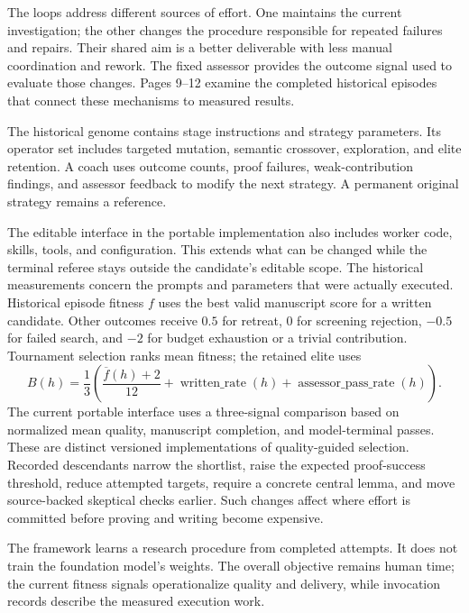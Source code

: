 The loops address different sources of effort. One maintains the current investigation; the other changes the procedure responsible for repeated failures and repairs. Their shared aim is a better deliverable with less manual coordination and rework. The fixed assessor provides the outcome signal used to evaluate those changes. Pages 9--12 examine the completed historical episodes that connect these mechanisms to measured results.

The historical genome contains stage instructions and strategy parameters. Its operator set includes targeted mutation, semantic crossover, exploration, and elite retention. A coach uses outcome counts, proof failures, weak-contribution findings, and assessor feedback to modify the next strategy. A permanent original strategy remains a reference.

The editable interface in the portable implementation also includes worker code, skills, tools, and configuration. This extends what can be changed while the terminal referee stays outside the candidate's editable scope. The historical measurements concern the prompts and parameters that were actually executed.
Historical episode fitness $f$ uses the best valid manuscript score for a written candidate. Other outcomes receive $0.5$ for retreat, $0$ for screening rejection, $-0.5$ for failed search, and $-2$ for budget exhaustion or a trivial contribution. Tournament selection ranks mean fitness; the retained elite uses
\[
B(h)=\frac13\left(\frac{\overline f(h)+2}{12}
      +\operatorname{written\_rate}(h)
      +\operatorname{assessor\_pass\_rate}(h)\right).
\]
The current portable interface uses a three-signal comparison based on normalized mean quality, manuscript completion, and model-terminal passes. These are distinct versioned implementations of quality-guided selection.
Recorded descendants narrow the shortlist, raise the expected proof-success threshold, reduce attempted targets, require a concrete central lemma, and move source-backed skeptical checks earlier. Such changes affect where effort is committed before proving and writing become expensive.

The framework learns a research procedure from completed attempts. It does not train the foundation model's weights. The overall objective remains human time; the current fitness signals operationalize quality and delivery, while invocation records describe the measured execution work.

